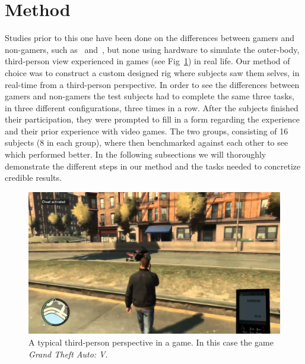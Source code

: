 \documentclass[runningheads,a4paper,oribibl]{llncs}
\begin{document}
\section{Method}
Studies prior to this one have been done on the differences between gamers and non-gamers, such as~\cite{schmierbach2011exploring} and~\cite{gong2015enhanced}, but none using hardware to simulate the outer-body, third-person view experienced in games (see Fig~\ref{fig:GTAIV}) in real life. Our method of choice was to construct a custom designed rig where subjects saw them selves, in real-time from a third-person perspective. In order to see the differences between gamers and non-gamers the test subjects had to complete the same three tasks, in three different configurations, three times in a row. After the subjects finished their participation, they were prompted to fill in a form regarding the experience and their prior experience with video games. The two groups, consisting of 16 subjects (8 in each group), where then benchmarked against each other to see which performed better. In the following subsections we will thoroughly demonstrate the different steps in our method and the tasks needed to concretize credible results.









\begin{figure}
   \centering
   \includegraphics[width=\textwidth]{ExternalMaterial/GTA}
   \caption{A typical third-person perspective in a game. In this case the game \emph{Grand Theft Auto: V}. \label{fig:GTAIV}}
\end{figure}
\end{document}
